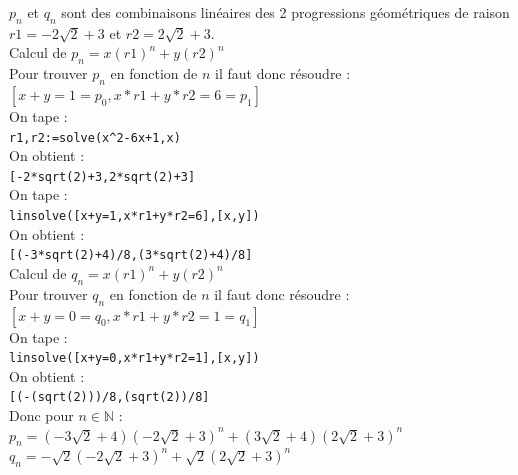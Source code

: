 \documentclass[a4paper,11pt]{book}
\newcommand{\N}{{\mathbb{N}}}
\begin{document}
\begin{enumerate}
$p_n$ et $q_n$ sont des combinaisons lin\'eaires des 2 progressions g\'eom\'etriques de raison $r1=-2\sqrt 2+3$ et $r2=2\sqrt 2+3$.\\
Calcul de $p_n=x(r1)^n+y(r2)^n$\\ 
Pour trouver $p_n$ en fonction de $n$ il faut donc r\'esoudre :\\
$[x+y=1=p_0,x*r1+y*r2=6=p_1]$\\
On tape :\\
{\tt r1,r2:=solve(x\verb|^|2-6x+1,x)}\\
On obtient :\\
{\tt [-2*sqrt(2)+3,2*sqrt(2)+3]}\\
On tape :\\
{\tt linsolve([x+y=1,x*r1+y*r2=6],[x,y])}\\
On obtient :\\
{\tt [(-3*sqrt(2)+4)/8,(3*sqrt(2)+4)/8]}\\
Calcul de $q_n=x(r1)^n+y(r2)^n$\\ 
Pour trouver $q_n$ en fonction de $n$ il faut donc r\'esoudre :\\
$[x+y=0=q_0,x*r1+y*r2=1=q_1]$\\
On tape :\\
{\tt linsolve([x+y=0,x*r1+y*r2=1],[x,y])}\\
On obtient :\\
{\tt [(-(sqrt(2)))/8,(sqrt(2))/8]}\\
Donc pour $n\in \N$ :\\
$p_n=(-3\sqrt 2+4)(-2\sqrt 2+3)^n+(3\sqrt 2+4)(2\sqrt 2+3)^n$\\
$q_n=-\sqrt 2(-2\sqrt 2+3)^n+\sqrt 2(2\sqrt 2+3)^n$


\end{enumerate}
\end{document}
